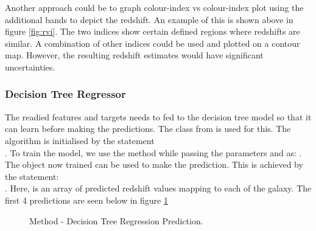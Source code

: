Another approach could be to graph colour-index vs colour-index plot using the additional bands to depict the redshift. An example of this is shown above in figure \ref{fig:rvi}. The two indices show certain defined regions where redshifts are similar. A combination of other indices could be used and plotted on a contour map. However, the resulting redshift estimates would have significant uncertainties.

\subsubsection{Decision Tree Regressor}
The readied features and targets needs to fed to the decision tree model so that it can learn before making the predictions. The  class from  is used for this. The algorithm is initialised by the statement\\ . To train the model, we use the  method while passing the parameters  and  as: . The  object now trained can be used to make the prediction. This is achieved by the statement:\\ . Here,  is an array of predicted redshift values mapping to each of the galaxy. The first 4 predictions are seen below in figure \ref{fig:prr}
\begin{figure}[H]
	\centering
	\caption{Method - Decision Tree Regression Prediction.}
	\label{fig:prr}
\end{figure}
